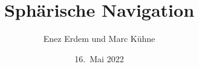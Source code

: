 %
%
%


\beamertemplatenavigationsymbolsempty
\title[Navigation]{Sphärische Navigation}
\author[E.~E.~und~M.~K.]{Enez Erdem und Marc Kühne}
\date[]{16.~Mai 2022}

